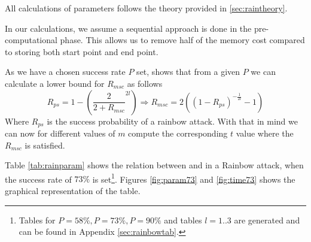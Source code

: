 All calculations of parameters follows the theory provided in
\ref{sec:raintheory}.

In our calculations, we assume a sequential approach is done in the
pre-computational phase. This allows us to remove half of the memory
cost compared to storing both start point and end point.

As we have a chosen success rate $P$ set, \cite[Proposition
29]{176} shows that from a given $P$ we can calculate a lower bound
for $R_{msc}$ as follows
\[R_{ps} = 1 - \left( \frac{2}{2 + R_{msc}}^{2l} \right) \Rightarrow R_{msc} = 2 ((1 - R_{ps})^{-\frac{1}{2l}} - 1)\] 
Where $R_{ps}$ is the success probability of a rainbow attack. With
that in mind we can now for different values of $m$ compute the
corresponding $t$ value where the $R_{msc}$ is satisfied. 

Table \ref{tab:rainparam} shows the relation between  and
 in a Rainbow attack, when the success rate of $73\%$ is set\footnote{Tables for $P = 58\%, P = 73\%, P = 90\%$ and tables $l=1..3$ are generated and can be
found in Appendix \ref{sec:rainbowtab}.}. Figures \ref{fig:param73}
and \ref{fig:time73} shows the graphical representation of the table.

